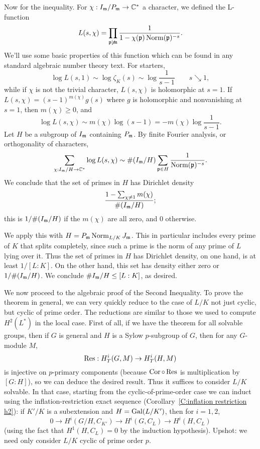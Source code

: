 Now for the inequality. For $\chi: I_{\mathfrak{m}}/P_{\mathfrak{m}} \to \mathbb{C}^*$ a
character, we defined the L-function
\[
L(s, \chi) = \prod_{\mathfrak{p} \not| \mathfrak{m}} \frac{1}{1 - \chi(\mathfrak{p}) 
\operatorname{Norm}(\mathfrak{p})^{-s}}.
\]
We'll use some basic properties of this function which can be found in any standard algebraic number theory text.
For starters,
\[
\log L(s, 1) \sim \log \zeta_K(s) \sim \log \frac{1}{s-1} \qquad
s \searrow 1,
\]
while if $\chi$ is not the trivial
character, $L(s, \chi)$ is holomorphic at $s=1$. If $L(s, \chi) =
(s-1)^{m(\chi)} g(s)$ where $g$ is holomorphic and nonvanishing at
$s=1$, then $m(\chi) \geq 0$, and
\[
\log L(s, \chi) \sim m(\chi) \log(s-1) = - m(\chi) \log \frac{1}{s-1}.
\]
Let $H$ be a subgroup of $I_{\mathfrak{m}}$ containing $P_{\mathfrak{m}}$.
By finite Fourier analysis, or orthogonality of
characters,
\[
\sum_{\chi: I_{\mathfrak{m}}/H \to \mathbb{C}^*} \log L(s, \chi) \sim
\#(I_{\mathfrak{m}}/H) \sum_{\mathfrak{p} \in H} \frac{1}{\operatorname{Norm}(\mathfrak{p})^{-s}}.
\]
We conclude that the set of primes in $H$ has Dirichlet density
\[
\frac{1 - \sum_{\chi \neq 1} m(\chi)}{\#(I_{\mathfrak{m}}/H)};
\]
this is $1/\#(I_{\mathfrak{m}}/H)$ if the $m(\chi)$ are all zero, and 0 otherwise.

We apply this with $H = P_{\mathfrak{m}} \operatorname{Norm}_{L/K} J_{\mathfrak{m}}$. This 
in particular includes
every prime of $K$ that splits completely, since such a prime is the norm
of any prime of $L$ lying over it. Thus the set of primes in $H$ has
Dirichlet density, on one hand, is at least $1/[L:K]$. On the other hand,
this set has density either zero or $1/\#(I_{\mathfrak{m}}/H)$. We conclude
$\#I_{\mathfrak{m}}/H \leq [L:K]$, as desired.


We now proceed to the algebraic proof of the Second Inequality.
To prove the theorem in general, we can very quickly reduce to the
case of $L/K$ not just cyclic, but cyclic of prime order. The reductions
are similar to those we used to compute $H^2(L^*)$ in the local case.
First of all, if we have the theorem for all solvable groups, then if
$G$ is general and $H$ is a Sylow $p$-subgroup of $G$, then for any 
$G$-module $M$,
\[
\operatorname{Res}: H^i_T(G, M) \to H^i_T(H, M)
\]
is injective on $p$-primary components (because $\operatorname{Cor} \circ \operatorname{Res}$
is multiplication by $[G:H]$), so we can deduce the desired result.
Thus it suffices to consider $L/K$ solvable. In that case, starting
from the cyclic-of-prime-order case we can induct using the 
inflation-restriction exact sequence (Corollary~\ref{C:inflation restriction h2}): if $K'/K$ is a subextension
and $H = \operatorname{Gal}(L/K')$, then for $i=1,2$, 
\[
0 \to H^i(G/H, C_{K'}) \to H^i(G, C_L) \to H^i(H, C_L)
\]
(using the fact that $H^1(H, C_L) = 0$ by the induction hypothesis).
Upshot: we need only consider $L/K$ cyclic of prime order $p$.

